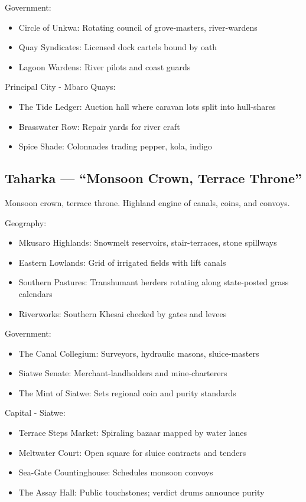 Government:
\begin{itemize}
    \item Circle of Unkwa: Rotating council of grove-masters, river-wardens
    \item Quay Syndicates: Licensed dock cartels bound by oath
    \item Lagoon Wardens: River pilots and coast guards
\end{itemize}

Principal City - Mbaro Quays:
\begin{itemize}
    \item The Tide Ledger: Auction hall where caravan lots split into hull-shares
    \item Brasswater Row: Repair yards for river craft
    \item Spice Shade: Colonnades trading pepper, kola, indigo
\end{itemize}

\subsection{Taharka --- ``Monsoon Crown, Terrace Throne''}
\label{sec:taharka}

Monsoon crown, terrace throne. Highland engine of canals, coins, and convoys.

Geography:
\begin{itemize}
    \item Mkusaro Highlands: Snowmelt reservoirs, stair-terraces, stone spillways
    \item Eastern Lowlands: Grid of irrigated fields with lift canals
    \item Southern Pastures: Transhumant herders rotating along state-posted grass calendars
    \item Riverworks: Southern Khesai checked by gates and levees
\end{itemize}

Government:
\begin{itemize}
    \item The Canal Collegium: Surveyors, hydraulic masons, sluice-masters
    \item Siatwe Senate: Merchant-landholders and mine-charterers
    \item The Mint of Siatwe: Sets regional coin and purity standards
\end{itemize}

Capital - Siatwe:
\begin{itemize}
    \item Terrace Steps Market: Spiraling bazaar mapped by water lanes
    \item Meltwater Court: Open square for sluice contracts and tenders
    \item Sea-Gate Countinghouse: Schedules monsoon convoys
    \item The Assay Hall: Public touchstones; verdict drums announce purity
\end{itemize}

